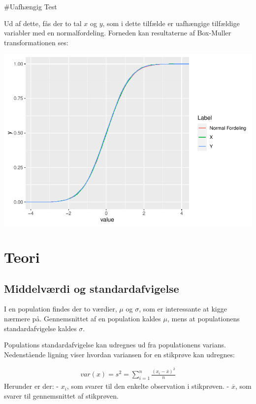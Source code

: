 \documentclass[
]{article}
\begin{document}
\#Uafhængig Test

Ud af dette, fås der to tal \(x\) og \(y\), som i dette tilfælde er
uafhængige tilfældige variabler med en normalfordeling. Forneden kan
resultaterne af Box-Muller transformationen ses:

\includegraphics{TP2_files/figure-latex/unnamed-chunk-6-1.pdf}

\hypertarget{teori}{%
\section{Teori}\label{teori}}

\hypertarget{middelvuxe6rdi-og-standardafvigelse}{%
\subsection{Middelværdi og
standardafvigelse}\label{middelvuxe6rdi-og-standardafvigelse}}

I en population findes der to værdier, \(\mu\) og \(\sigma\), som er
interessante at kigge nærmere på. Gennemsnittet af en population kaldes
\(\mu\), mens at populationens standardafvigelse kaldes \(\sigma\).

Populations standardafvigelse kan udregnes ud fra populationens varians.
Nedenstående ligning viser hvordan variansen for en stikprøve kan
udregnes:

\[
\begin{aligned}
var(x)=s^2 = \sum_{i=1}^{n} \frac{(x_i-\overline{x})^2}{n}
\end{aligned}
\] Herunder er der: - \(x_i\), som svarer til den enkelte observation i
stikprøven. - \(\overline{x}\), som svarer til gennemsnittet af
stikprøven.
\end{document}
